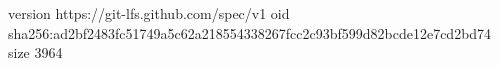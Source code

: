version https://git-lfs.github.com/spec/v1
oid sha256:ad2bf2483fc51749a5c62a218554338267fcc2c93bf599d82bcde12e7cd2bd74
size 3964
